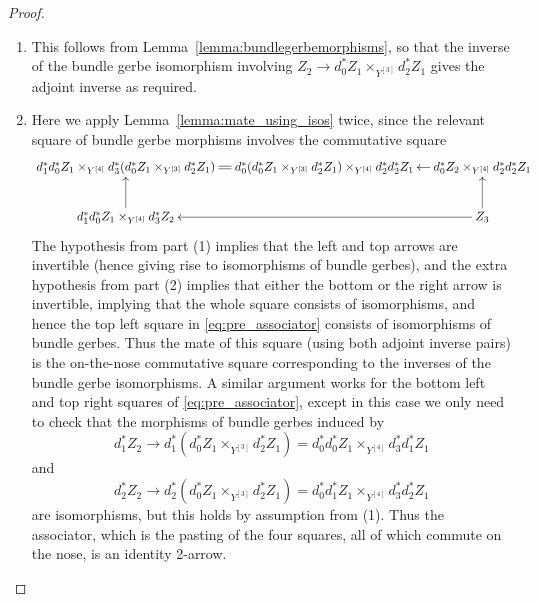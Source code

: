 \documentclass[12pt]{amsart}
\theoremstyle{plain}
\theoremstyle{definition}
\theoremstyle{remark}
\numberwithin{equation}{section}
\newcommand{\<}{\langle}
\renewcommand{\>}{\rangle}
\begin{document}
\begin{proof}
\begin{enumerate}
\item This follows from Lemma~\ref{lemma:bundlegerbemorphisms}, so that the inverse of the bundle gerbe isomorphism involving $Z_2\to d_0^* Z_1\times_{Y^{[3]}} d_2^*Z_1$ gives the adjoint inverse as required.

\item Here we apply Lemma~\ref{lemma:mate_using_isos} twice, since the relevant square of bundle gerbe morphisms involves the commutative square
\[
	\xymatrix@C=1em{
		 d_1^*d_0^*Z_1\times_{Y^{[4]}} d_3^*(d_0^*Z_1\times_{Y^{[3]}}d_2^*Z_1)
		 \ar@{=}[r] & d_0^*(d_0^*Z_1 \times_{Y^{[3]}} d_2^*Z_1)\times_{Y^{[4]}} d_2^*d_2^*Z_1
		  & \ar[l] d_0^*Z_2\times_{Y^{[4]}} d_2^*d_2^*Z_1 \\
		\ar[u] d_1^* d_0^*Z_1\times_{Y^{[4]}} d_3^*Z_2 && \ar[ll] \ar[u] Z_3
	}
\]
The hypothesis from part (1) implies that the left and top arrows are invertible (hence giving rise to isomorphisms of bundle gerbes), and the extra hypothesis from part (2) implies that either the bottom or the right arrow is invertible, implying that the whole square consists of isomorphisms, and hence the top left square in \eqref{eq:pre_associator} consists of isomorphisms of bundle gerbes. Thus the mate of this square (using both adjoint inverse pairs) is the on-the-nose commutative square corresponding to the inverses of the bundle gerbe isomorphisms.
A similar argument works for the bottom left and top right squares of \eqref{eq:pre_associator}, except in this case we only need to check that the morphisms of bundle gerbes induced by 
\[
	d_1^*Z_2 \to d_1^*(d_0^*Z_1 \times_{Y^{[3]}}d_2^* Z_1) = d_0^* d_0^* Z_1 \times_{Y^{[4]}} d_3^*d_1^*Z_1  
\] 
and
\[
	d_2^* Z_2 \to d_2^*(d_0^*Z_1 \times_{Y^{[3]}}d_2^* Z_1) = d_0^*d_1^*Z_1\times_{Y^{[4]}}d_3^*d_2^*Z_1 
\]
are isomorphisms, but this holds by assumption from (1).
Thus the associator, which is the pasting of the four squares, all of which commute on the nose, is an identity 2-arrow. \qedhere
\end{enumerate}
\end{proof}
\end{document}
